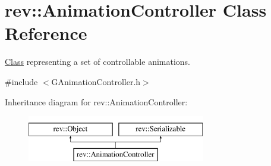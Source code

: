 \hypertarget{classrev_1_1_animation_controller}{}\section{rev\+::Animation\+Controller Class Reference}
\label{classrev_1_1_animation_controller}


\mbox{\hyperlink{struct_class}{Class}} representing a set of controllable animations.  




{\ttfamily \#include $<$G\+Animation\+Controller.\+h$>$}

Inheritance diagram for rev\+::Animation\+Controller\+:\begin{figure}[H]
\begin{center}
\leavevmode
\includegraphics[height=2.000000cm]{classrev_1_1_animation_controller}
\end{center}
\end{figure}
